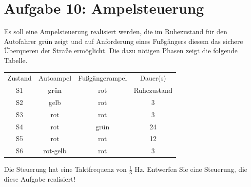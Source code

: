 \documentclass[a4paper,12pt,titlepage]{scrartcl}
\begin{document}
\section*{Aufgabe 10: Ampelsteuerung}
Es soll eine Ampelsteuerung realisiert werden, die im Ruhezustand für den Autofahrer grün zeigt und auf Anforderung eines Fußgängers diesem das sichere Überqueren der Straße ermöglicht. Die dazu nötigen Phasen zeigt die folgende Tabelle.
\begin{tabular}{c|c|c|c}
    Zustand & Autoampel & Fußgängerampel & Dauer(s)\\
    S1 & grün & rot & Ruhezustand \\
    S2 & gelb & rot & 3 \\
    S3 & rot & rot & 3 \\
    S4 & rot & grün & 24 \\
    S5 & rot & rot & 12 \\
    S6 & rot-gelb & rot & 3
\end{tabular}
Die Steuerung hat eine Taktfrequenz von $\frac{1}{3}$ Hz.
Entwerfen Sie eine Steuerung, die diese Aufgabe realisiert!
\end{document}

